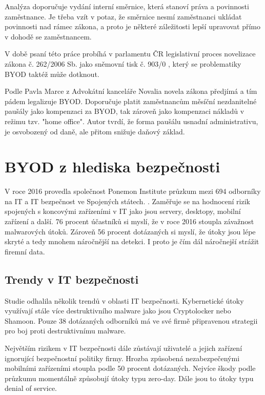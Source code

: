 Analýza  doporučuje vydání interní směrnice, která stanoví práva a povinnosti zaměstnance. Je třeba vzít v potaz, že směrnice nesmí zaměstnanci ukládat povinnosti nad rámec zákona, a proto je některé záležitosti lepší upravovat přímo v dohodě se zaměstnancem.

V době psaní této práce probíhá v parlamentu ČR legislativní proces novelizace zákona č. 262/2006 Sb. jako sněmovní tisk č. 903/0 , který se problematiky BYOD taktéž může dotknout.

Podle Pavla Marce z Advokátní kanceláře Novalia  novela zákona předjímá a tím pádem legalizuje BYOD. Doporučuje platit zaměstnancům měsíční nezdanitelné paušály jako kompenzaci za BYOD, tak zároveň jako kompenzaci nákladů v režimu tzv. "home office". Autor tvrdí, že forma paušálu usnadní administrativu, je osvobozený od daně, ale přitom snižuje daňový základ. 

\section{BYOD z hlediska bezpečnosti}

V roce 2016 provedla společnost Ponemon Institute průzkum mezi 694 odborníky na IT a IT bezpečnost ve Spojených státech. . Zaměřuje se na hodnocení rizik spojených s koncovými zařízeními v IT jako jsou servery, desktopy, mobilní zařízení a další. 76 procent účastníků si myslí, že v roce 2016 stoupla závažnost malwarových útoků. Zároveň 56 procent dotázaných si myslí, že útoky jsou lépe skryté a tedy mnohem náročnější na detekci. I proto je čím dál náročnejší strážit firemní data.


\subsection{Trendy v IT bezpečnosti}

Studie odhalila několik trendů v oblasti IT bezpečnosti. Kybernetické útoky využívají stále více destruktivního malware jako jsou Cryptolocker nebo Shamoon. Pouze 38 dotázaných odborníků má ve své firmě připravenou strategii pro boj proti destruktivnímu malware.

Největším rizikem v IT bezpečnosti dále zůstávají uživatelé a jejich zařízení ignorující bezpečnostní politiky firmy. Hrozba způsobená nezabezpečenými mobilními zařízeními stoupla podle 50 procent dotázaných. Nejvíce škody podle průzkumu momentálně způsobují útoky typu zero-day. Dále jsou to útoky typu denial of service.

